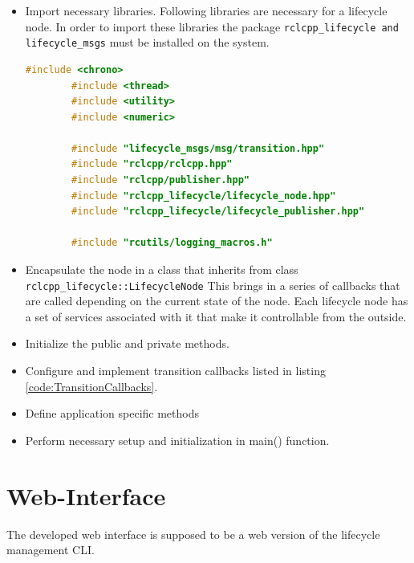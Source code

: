 \begin{itemize}
	\item Import necessary libraries. Following libraries are necessary for a lifecycle node. In order to import these libraries the package \lstinline{rclcpp_lifecycle and lifecycle_msgs} must be installed on the system. \begin{lstlisting}[language=cpp]
		#include <chrono>
		#include <thread>
		#include <utility>
		#include <numeric>

		#include "lifecycle_msgs/msg/transition.hpp"
		#include "rclcpp/rclcpp.hpp"
		#include "rclcpp/publisher.hpp"
		#include "rclcpp_lifecycle/lifecycle_node.hpp"
		#include "rclcpp_lifecycle/lifecycle_publisher.hpp"

		#include "rcutils/logging_macros.h"

	\end{lstlisting}
	\item Encapsulate the node in a class that inherits from class \lstinline{rclcpp_lifecycle::LifecycleNode} This brings in a series of callbacks that are called depending on the current state of the node. Each lifecycle node has a set of services associated with it that make it controllable from the outside.
	\item Initialize the public and private methods.
	\item Configure and implement transition callbacks listed in listing \ref{code:TransitionCallbacks}.
	\item Define application specific methods
	\item Perform necessary setup and initialization in main() function.  
\end{itemize}

\section{Web-Interface}
\label{Implementierung:VueBasedWebinterface}
The developed web interface is supposed to be a web version of the lifecycle management CLI. 

